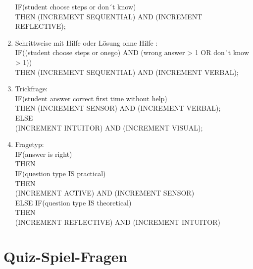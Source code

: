 \begin{enumerate}
  IF(student choose steps or don´t know)\\
  THEN 
  (INCREMENT SEQUENTIAL) AND  (INCREMENT REFLECTIVE);
  \item Schrittweise mit Hilfe oder Lösung ohne Hilfe : \\
  IF((student choose steps or onego) AND (wrong answer > 1 OR don´t know > 1))\\
  THEN 
  (INCREMENT SEQUENTIAL) AND  (INCREMENT VERBAL);
  \item Trickfrage: \\ \label{RulesII}
  IF(student answer correct first time without help)\\
  THEN 
  (INCREMENT SENSOR) AND  (INCREMENT VERBAL);\\
  ELSE\\ 
  (INCREMENT INTUITOR) AND (INCREMENT VISUAL);
  \item Fragetyp:\\
  IF(answer is right)\\
  THEN \\
  IF(question type IS practical)\\
  THEN\\
  (INCREMENT ACTIVE) AND (INCREMENT SENSOR)\\
  ELSE IF(question type IS theoretical)\\
  THEN\\
  (INCREMENT REFLECTIVE) AND (INCREMENT INTUITOR)
\end{enumerate}
\endgroup 

\section{Quiz-Spiel-Fragen} \label{FragenQuizSpiel}

